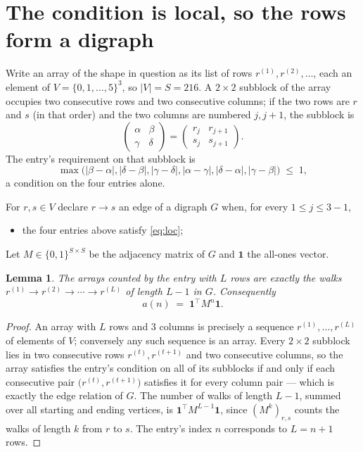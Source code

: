\documentclass[11pt,a4paper]{article}
\theoremstyle{plain}
\newtheorem{lemma}[theorem]{Lemma}
\theoremstyle{definition}
\begin{document}
\section{The condition is local, so the rows form a digraph}

Write an array of the shape in question as its list of rows
$r^{(1)},r^{(2)},\dots$, each an element of
$V=\{0,1,\dots,5\}^{3}$, so $|V|=S=216$. A $2\times2$ subblock of the array
occupies two consecutive rows and two consecutive columns; if the two rows are $r$
and $s$ (in that order) and the two columns are numbered $j,j+1$,
the subblock is
\[
\begin{pmatrix}\alpha&\beta\\\gamma&\delta\end{pmatrix}=\begin{pmatrix}r_j&r_{j+1}\\s_j&s_{j+1}\end{pmatrix}.
\]
The entry's requirement on that subblock is
\begin{equation}\label{eq:loc}
\max\bigl(|\beta-\alpha|,|\delta-\beta|,|\gamma-\delta|,|\alpha-\gamma|,|\delta-\alpha|,|\gamma-\beta|\bigr)\;\le\;1,
\end{equation}
a condition on the four entries alone.

For $r,s\in V$ declare $r\to s$ an edge of a digraph $G$ when, for every
$1\le j\le 3-1$,
\begin{itemize}
\item the four entries above satisfy \eqref{eq:loc};

\end{itemize}
Let $M\in\{0,1\}^{S\times S}$ be the adjacency matrix of $G$ and $\mathbf{1}$ the
all-ones vector.

\begin{lemma}\label{lem:walk}
The arrays counted by the entry with $L$ rows are exactly the walks
$r^{(1)}\to r^{(2)}\to\cdots\to r^{(L)}$ of length $L-1$ in $G$. Consequently
\[
a(n)\;=\;\mathbf{1}^{\!\top}M^{n}\mathbf{1} .
\]
\end{lemma}

\begin{proof}
An array with $L$ rows and $3$ columns is precisely a sequence
$r^{(1)},\dots,r^{(L)}$ of elements of $V$; conversely any such sequence is an array.
Every $2\times2$ subblock lies in two consecutive rows $r^{(t)},r^{(t+1)}$ and two
consecutive columns, so the array satisfies the entry's condition on all of its subblocks
if and only if each consecutive pair $\bigl(r^{(t)},r^{(t+1)}\bigr)$ satisfies it for
every column pair --- which is exactly the edge relation of $G$. The number of walks of
length $L-1$, summed over all starting and ending vertices, is
$\mathbf{1}^{\!\top}M^{L-1}\mathbf{1}$, since $(M^{k})_{r,s}$ counts the walks of
length $k$ from $r$ to $s$. The entry's index $n$ corresponds to $L=n+1$ rows.
\end{proof}
\end{document}
